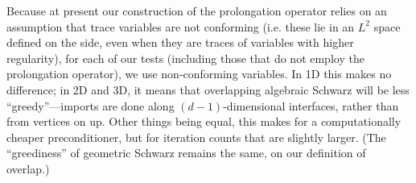 \documentclass[11pt]{amsart}
\begin{document}
Because at present our construction of the prolongation operator relies on an assumption that trace variables are not conforming (i.e. these lie in an $L^2$ space defined on the side, even when they are traces of variables with higher regularity), for each of our tests (including those that do not employ the prolongation operator), we use non-conforming variables.  In 1D this makes no difference; in 2D and 3D, it means that overlapping algebraic Schwarz will be less ``greedy''---imports are done along $(d-1)$-dimensional interfaces, rather than from vertices on up.  Other things being equal, this makes for a computationally cheaper preconditioner, but for iteration counts that are slightly larger.  (The ``greediness'' of geometric Schwarz remains the same, on our definition of overlap.)

\newcommand{\plotscaling}{1.1}
\newcommand{\meshwidthindex}{4}
\newcommand{\iterationcountindex}{6}
\newcommand{\maxmyrows}{2000}
\newcommand{\PoissonOneDNthPoint}{5} %
\newcommand{\PoissonTwoDNthPoint}{3} %
\newcommand{\PoissonThreeDNthPoint}{2} %
\newcommand{\PoissonOneDStride}{45}
\newcommand{\PoissonTwoDStride}{12}
\newcommand{\PoissonThreeDStride}{6}
\newcommand{\PoissonOneDSchwarzAlgebraicStart}{320} %
\newcommand{\PoissonOneDSchwarzGeometricStart}{455}
\newcommand{\PoissonOneDGMGSchwarzAlgebraicStart}{50} %
\newcommand{\PoissonOneDGMGSchwarzGeometricStart}{185}
\newcommand{\PoissonTwoDSchwarzAlgebraicStart}{87} %
\newcommand{\PoissonTwoDSchwarzGeometricStart}{123}
\newcommand{\PoissonTwoDGMGSchwarzAlgebraicStart}{15} %
\newcommand{\PoissonTwoDGMGSchwarzGeometricStart}{51}
\newcommand{\PoissonThreeDSchwarzAlgebraicStart}{32} %
\newcommand{\PoissonThreeDSchwarzGeometricStart}{44}
\newcommand{\PoissonThreeDGMGSchwarzAlgebraicStart}{8} %
\newcommand{\PoissonThreeDGMGSchwarzGeometricStart}{20}

\end{document}
